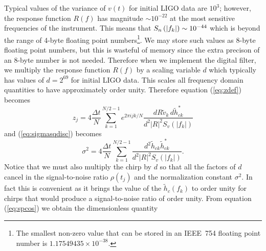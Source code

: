 Typical values of the variance of $v(t)$ for initial LIGO data are $10^3$;
however, the response function $R(f)$ has magnitude $\sim 10^{-22}$ at the most
sensitive frequencies of the instrument.  This means that $S_n\left(\left|f_{k}\right|\right) \sim
10^{-44}$ which is beyond the range of 4-byte floating point
numbers\footnote{The smallest non-zero value that can be stored in an IEEE~754
floating point number is $1.17549435\times 10^{-38}$.}. We may store such
values as 8-byte floating point numbers, but this is wasteful of memory since
the extra precison of an 8-byte number is not needed. Therefore when we
implement the digital filter, we multiply the response function $R(f)$ by a
scaling variable $d$ which typically has values of $d = 2^{69}$ for initial
LIGO data. This scales all frequency domain quantities to have approximately
order unity.  Therefore equation (\ref{eq:zdef}) becomes
\begin{equation}
\label{eq:zdefcal}
z_j = 4 \frac{\Delta t}{N} \sum_{k=1}^{N/2-1} e^{2\pi ijk/N} 
  \frac{dR\tilde{v}_k\, d\tilde{h}_{ck}^\ast}
  {d^2|R|^2S_v\left(\left|f_k\right|\right)}
\end{equation}
and (\ref{eq:sigmasqdisc}) becomes
\begin{equation}
\label{eq:sigmasqdisccal}
\sigma^2 = 4 \frac{\Delta t}{N} \sum_{k=1}^{N/2-1}
\frac{d^2 \tilde{h}_{ck}\tilde{h}_{ck}^\ast}
{d^2|R|^2S_v\left(\left|f_k\right|\right)}. 
\end{equation}
Notice that we must also multiply the chirp by $d$ so that all the factors of
$d$ cancel in the signal-to-noise ratio $\rho(t_j)$ and the normalization
constant $\sigma^2$. In fact this is convenient as it brings the value of
the $\tilde{h}_c(f_k)$ to order unity for chirps that would produce a
signal-to-noise ratio of order unity. From equation (\ref{eq:spcos}) we obtain
the dimensionless quantity
